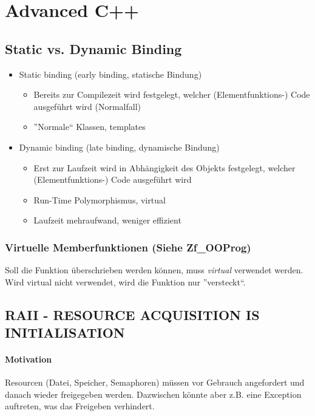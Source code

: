 \section{Advanced C++}

\subsection{Static vs. Dynamic Binding}
\begin{itemize}
	\item Static binding (early binding, statische Bindung)
		\begin{itemize}
			\item Bereits zur Compilezeit wird festgelegt, welcher (Elementfunktions-) Code
				ausgeführt wird (Normalfall)
			\item ''Normale`` Klassen, templates
		\end{itemize}
	\item Dynamic binding (late binding, dynamische Bindung)
		\begin{itemize}
			\item Erst zur Laufzeit wird in Abhängigkeit des Objekts festgelegt, welcher
				(Elementfunktions-) Code ausgeführt wird
			\item Run-Time Polymorphismus, virtual
			\item Laufzeit mehraufwand, weniger effizient
		\end{itemize}
\end{itemize}

\subsubsection{Virtuelle Memberfunktionen (Siehe Zf\_OOProg)}
Soll die Funktion überschrieben werden können, muss \emph{virtual} verwendet werden.
Wird virtual nicht verwendet, wird die Funktion nur ''versteckt``.



\subsection[RAII]{RAII - RESOURCE ACQUISITION IS INITIALISATION}

\paragraph{Motivation}
Resourcen (Datei, Speicher, Semaphoren) müssen vor Gebrauch angefordert und danach wieder freigegeben werden.
Dazwischen könnte aber z.B. eine Exception auftreten, was das Freigeben verhindert.

